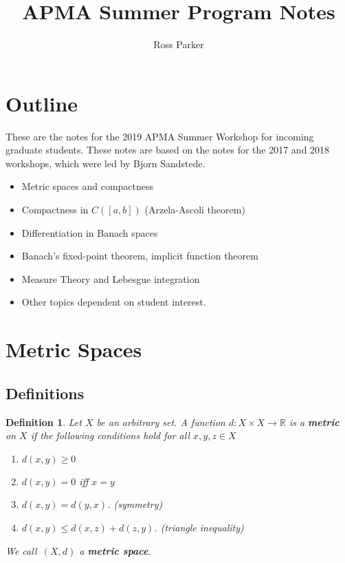 \documentclass[10pt]{article}         %
\title{APMA Summer Program Notes}
\author{Ross Parker}
\newtheorem{definition}{Definition}[section]
\theoremstyle{remark}
\begin{document}
\maketitle

\section*{Outline}
\label{sec: introduction}
These are the notes for the 2019 APMA Summer Workshop for incoming graduate students. These notes are based on the notes for the 2017 and 2018 workshops, which were led by Bjorn Sandstede.

\begin{itemize}
    \item Metric spaces and compactness
    \item Compactness in $C([a,b])$ (Arzela-Ascoli theorem)
    \item Differentiation in Banach spaces
    \item Banach's fixed-point theorem, implicit function theorem
    \item Measure Theory and Lebesgue integration
    \item Other topics dependent on student interest.
\end{itemize}

\section{Metric Spaces}
\label{sec: metric_spaces}

\subsection{Definitions}

\begin{definition}
Let $X$ be an arbitrary set. A function $d : X \times X \rightarrow \mathbb{R}$ is a \textbf{metric} on $X$ if the following conditions hold for all $x, y, z \in X$
\begin{enumerate}
\item $d(x,y) \geq 0$
\item $d(x,y) = 0$ iff $x = y$
\item $d(x,y) = d(y,x)$. (symmetry)
\item $d(x,y) \leq d(x,z) + d(z,y)$. (triangle inequality)
\end{enumerate}
We call\ $(X, d)$ a \textbf{metric space}.
\end{definition}
\end{document}
